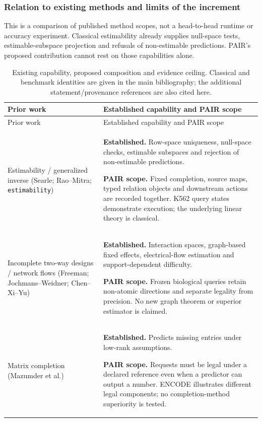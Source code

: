 \documentclass[11pt]{article}
\begin{document}
\subsubsection{Relation to existing methods and limits of the increment}
This is a comparison of published method scopes, not a head-to-head runtime or accuracy experiment. Classical estimability already supplies null-space tests, estimable-subspace projection and refusals of non-estimable predictions. PAIR's proposed contribution cannot rest on those capabilities alone.
\begingroup\small
\begin{longtable}{@{}>{\raggedright\arraybackslash}p{}>{\raggedright\arraybackslash}p{}@{}}
\caption{Existing capability, proposed composition and evidence ceiling. Classical and benchmark identities are given in the main bibliography; the additional statement/provenance references are also cited here.}\\
\toprule
Prior work & Established capability and PAIR scope \\
\midrule
\endfirsthead
\toprule Prior work & Established capability and PAIR scope \\
\midrule\endhead
Estimability / generalized inverse (Searle; Rao--Mitra; \texttt{estimability}) & \textbf{Established.} Row-space uniqueness, null-space checks, estimable subspaces and rejection of non-estimable predictions. \par\smallskip\textbf{PAIR scope.} Fixed completion, source maps, typed relation objects and downstream actions are recorded together. K562 query states demonstrate execution; the underlying linear theory is classical.  \\
Incomplete two-way designs / network flows (Freeman; Jochmans--Weidner; Chen--Xi--Yu) & \textbf{Established.} Interaction spaces, graph-based fixed effects, electrical-flow estimation and support-dependent difficulty. \par\smallskip\textbf{PAIR scope.} Frozen biological queries retain non-atomic directions and separate legality from precision. No new graph theorem or superior estimator is claimed.  \\
Matrix completion (Mazumder et al.) & \textbf{Established.} Predicts missing entries under low-rank assumptions. \par\smallskip\textbf{PAIR scope.} Requests must be legal under a declared reference even when a predictor can output a number. ENCODE illustrates different legal components; no completion-method superiority is tested.  \\

\end{longtable}
\end{document}
